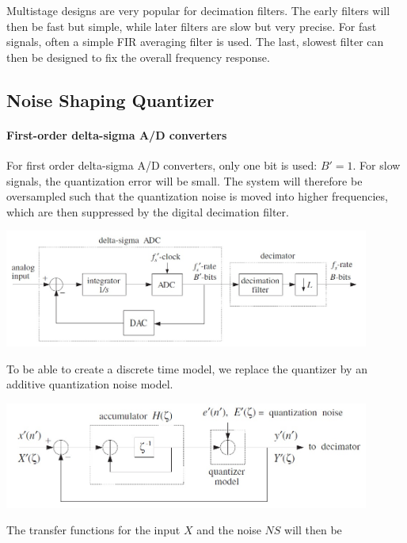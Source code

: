Multistage designs are very popular for decimation filters. The early filters will
then be fast but simple, while later filters are slow but very precise. For fast
signals, often a simple FIR averaging filter is used. The last, slowest filter
can then be designed to fix the overall frequency response.


\subsection{Noise Shaping Quantizer}

\paragraph{First-order delta-sigma A/D converters}
For first order delta-sigma A/D converters, only one bit is used: $B'=1$. For
slow signals, the quantization error will be small. The system will therefore
be oversampled such that the quantization noise is moved into higher frequencies,
which are then suppressed by the digital decimation filter.

\begin{center}
	\includegraphics[width=12cm]{images/IntDecOv_SigmaDelta.jpg}
\end{center}

To be able to create a discrete time model, we replace the quantizer by
an additive quantization noise model.

\begin{center}
	\includegraphics[width=12cm]{images/IntDecOv_SigmaDeltaModel.jpg}
\end{center}

The transfer functions for the input $X$ and the noise $NS$ will then be

